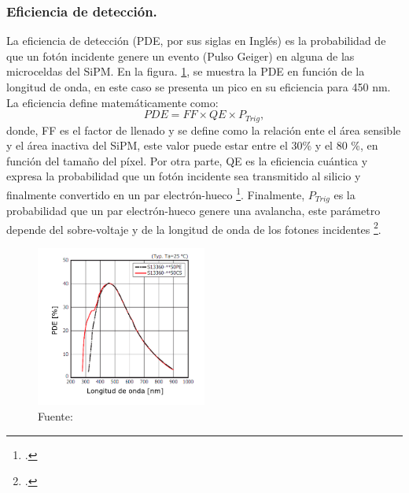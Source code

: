 \subsubsection{Eficiencia de detección.}
La eficiencia de detección (PDE, por sus siglas en Inglés) es la probabilidad de que un fotón incidente genere un evento (Pulso Geiger) en alguna de las microceldas del SiPM. En la figura. \ref{fig:PDE}, se muestra la PDE en función de la longitud de onda, en este caso se presenta un pico en su eficiencia para 450 nm. La eficiencia define matemáticamente como:
\begin{equation}
    PDE= FF\times QE \times P_{Trig},
\end{equation}
donde, FF es el factor de llenado y  se define como la relación ente el área sensible y el área inactiva del SiPM, este valor puede  estar entre el 30\% y el 80 \%, en función del tamaño del píxel. Por otra parte, QE es la eficiencia cuántica y expresa la probabilidad que un fotón incidente sea transmitido al silicio y finalmente convertido en un par electrón-hueco \footcite{Study_SiPM}. Finalmente, $P_{Trig}$ es la probabilidad que un par electrón-hueco genere una avalancha, este parámetro depende del sobre-voltaje y de la longitud de onda de los fotones incidentes \footcite{Study_SiPM_FBK}.\\

\begin{figure}[h!]
\begin{centering}
    \caption{PDE en función de la longitud de onda para la serie S13360 de Hamamatsu. Adaptado de \footcite{Sipm_S13360_1350CS_datasheet}.}
    \includegraphics[width=0.5\textwidth]{Images/PDE.PNG}
    \caption*{Fuente:}
    \label{fig:PDE}  
  \par\end{centering}
\end{figure}

